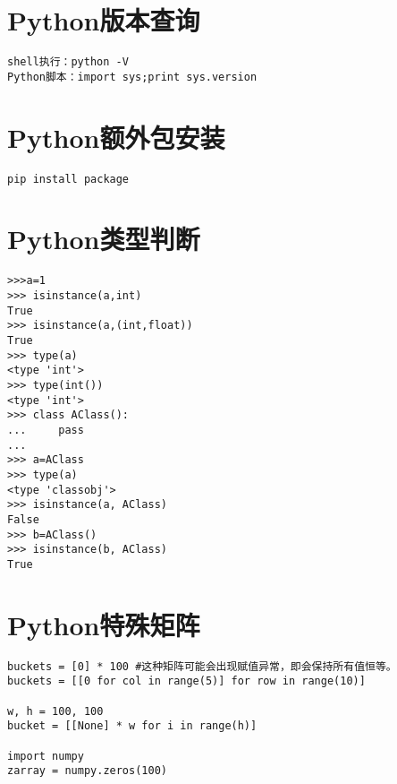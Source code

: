 

\section{Python版本查询}
\begin{verbatim}
shell执行：python -V
Python脚本：import sys;print sys.version
\end{verbatim}

\section{Python额外包安装}
\begin{verbatim}
pip install package
\end{verbatim}


\section{Python类型判断}
\begin{verbatim}
>>>a=1
>>> isinstance(a,int)
True
>>> isinstance(a,(int,float))
True
>>> type(a)
<type 'int'>
>>> type(int())
<type 'int'>
>>> class AClass():
...     pass
... 
>>> a=AClass
>>> type(a)
<type 'classobj'>
>>> isinstance(a, AClass)
False
>>> b=AClass()
>>> isinstance(b, AClass)
True
\end{verbatim}

\section{Python特殊矩阵}
\begin{verbatim}
buckets = [0] * 100 #这种矩阵可能会出现赋值异常，即会保持所有值恒等。
buckets = [[0 for col in range(5)] for row in range(10)]

w, h = 100, 100
bucket = [[None] * w for i in range(h)]

import numpy
zarray = numpy.zeros(100)


\end{verbatim}









